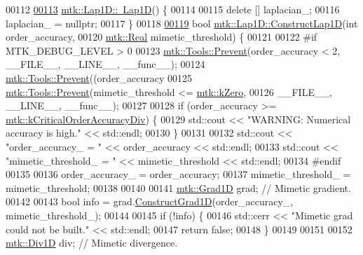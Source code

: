 \begin{DoxyCode}
00112 
\hypertarget{mtk__lap__1d_8cc_source_l00113}{}\hyperlink{classmtk_1_1Lap1D_ac0cb868243a66658cc46de5b818fa4e8}{00113} \hyperlink{classmtk_1_1Lap1D_ac0cb868243a66658cc46de5b818fa4e8}{mtk::Lap1D::~Lap1D}() \{
00114 
00115   \textcolor{keyword}{delete} [] laplacian\_;
00116   laplacian\_ = \textcolor{keyword}{nullptr};
00117 \}
00118 
\hypertarget{mtk__lap__1d_8cc_source_l00119}{}\hyperlink{classmtk_1_1Lap1D_a685dcba88c08cf5b7b6c2aa4669a472c}{00119} \textcolor{keywordtype}{bool} \hyperlink{classmtk_1_1Lap1D_a685dcba88c08cf5b7b6c2aa4669a472c}{mtk::Lap1D::ConstructLap1D}(\textcolor{keywordtype}{int} order\_accuracy,
00120                                 \hyperlink{group__c01-roots_gac080bbbf5cbb5502c9f00405f894857d}{mtk::Real} mimetic\_threshold) \{
00121 
00122 \textcolor{preprocessor}{  #if MTK\_DEBUG\_LEVEL > 0}
00123   \hyperlink{classmtk_1_1Tools_afe5bb096309258e2e72503fd7b41c7e0}{mtk::Tools::Prevent}(order\_accuracy < 2, \_\_FILE\_\_, \_\_LINE\_\_, \_\_func\_\_);
00124   \hyperlink{classmtk_1_1Tools_afe5bb096309258e2e72503fd7b41c7e0}{mtk::Tools::Prevent}((order\_accuracy%
00125   \hyperlink{classmtk_1_1Tools_afe5bb096309258e2e72503fd7b41c7e0}{mtk::Tools::Prevent}(mimetic\_threshold <= \hyperlink{group__c01-roots_ga59a451a5fae30d59649bcda274fea271}{mtk::kZero},
00126                       \_\_FILE\_\_, \_\_LINE\_\_, \_\_func\_\_);
00127 
00128   \textcolor{keywordflow}{if} (order\_accuracy >= \hyperlink{group__c01-roots_ga0898eef2108473e44a5223932d571c31}{mtk::kCriticalOrderAccuracyDiv}) \{
00129     std::cout << \textcolor{stringliteral}{"WARNING: Numerical accuracy is high."} << std::endl;
00130   \}
00131 
00132   std::cout << \textcolor{stringliteral}{"order\_accuracy\_ = "} << order\_accuracy << std::endl;
00133   std::cout << \textcolor{stringliteral}{"mimetic\_threshold\_ = "} << mimetic\_threshold << std::endl;
00134 \textcolor{preprocessor}{  #endif}
00135 
00136   order\_accuracy\_ = order\_accuracy;
00137   mimetic\_threshold\_ = mimetic\_threshold;
00138 
00140 
00141   \hyperlink{classmtk_1_1Grad1D}{mtk::Grad1D} grad; \textcolor{comment}{// Mimetic gradient.}
00142 
00143   \textcolor{keywordtype}{bool} info = grad.\hyperlink{classmtk_1_1Grad1D_a74ef5245cfae6fd158bd7f563a0c2e52}{ConstructGrad1D}(order\_accuracy\_, mimetic\_threshold\_);
00144 
00145   \textcolor{keywordflow}{if} (!info) \{
00146     std::cerr << \textcolor{stringliteral}{"Mimetic grad could not be built."} << std::endl;
00147     \textcolor{keywordflow}{return} \textcolor{keyword}{false};
00148   \}
00149 
00151 
00152   \hyperlink{classmtk_1_1Div1D}{mtk::Div1D} div; \textcolor{comment}{// Mimetic divergence.}

\end{DoxyCode}
